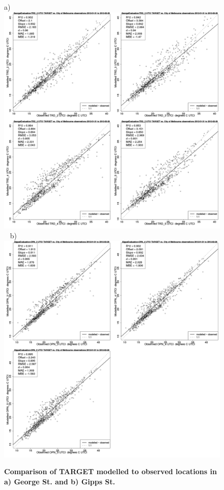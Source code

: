 \documentclass[final,3p,times,authoryear]{elsarticle}
\begin{document}
\begin{figure}[!htbp]
a) \includegraphics[scale=0.15]{images/Eval/GeorgeEvaluation-ErrorPlots-UTCI.png}
~ b)
\includegraphics[scale=0.15]{images/Eval/GippsEvaluation-ErrorPlots-UTCI.png}

\caption{\bf Comparison of TARGET modelled  to observed locations in a) George St. and b) Gipps St.}    
 \label{fig:utcieval} 
\end{figure} 
\end{document}
